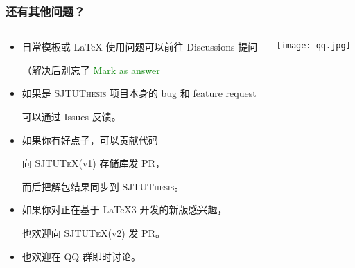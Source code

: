 \begin{frame}
  \frametitle{还有其他问题？}
  \begin{columns}
    \begin{column}{0.73\textwidth}
      \begin{itemize}
        \item[{\faComment*[regular]}] 日常模板或 \LaTeX{} 使用问题可以前往 Discussions  提问

        （解决后别忘了 \textcolor{green}{\faCheckCircle{} Mark as answer}
        \item[{\faDotCircle[regular]}] 如果是 \textsc{SJTUThesis} 项目本身的 bug 和 feature request

        可以通过 Issues  反馈。
        \item[{\faCodeBranch}] 如果你有好点子，可以贡献代码

          向 \textsc{SJTU\TeX{}}(v1)  存储库发 PR，\par
          而后把解包结果同步到 \textsc{SJTUThesis}。

        \item[{\faTag}] 如果你对正在基于 \LaTeX3 开发的新版感兴趣，\par
          也欢迎向 \textsc{SJTU\TeX{}}(v2)  发 PR。

        \item[{\faQq}] 也欢迎在 QQ 群即时讨论。
      \end{itemize}
    \end{column}
    \begin{column}{0.27\textwidth}
      \texttt{[image: qq.jpg]}
    \end{column}
  \end{columns}
\end{frame}
